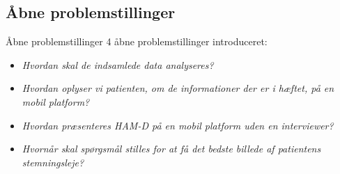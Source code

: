 \subsection{Åbne problemstillinger}
\begin{frame}{Åbne problemstillinger}
4 åbne problemstillinger introduceret:
\begin{itemize}
\item \textit{Hvordan skal de indsamlede data analyseres?}

\item \textit{Hvordan oplyser vi patienten, om de informationer der er i hæftet, på en mobil platform?}

\item \textit{Hvordan præsenteres HAM-D på en mobil platform uden en interviewer?}

\item \textit{Hvornår skal spørgsmål stilles for at få det bedste billede af patientens stemningsleje?}

\end{itemize}
\end{frame}
